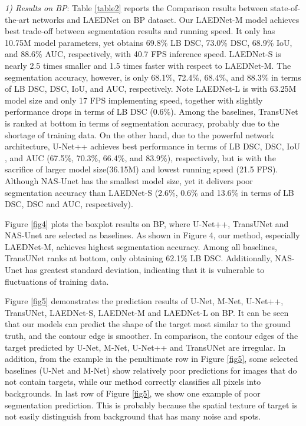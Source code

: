 \documentclass[review]{elsarticle}
\begin{document}
\emph{1) Results on BP}: Table \ref{table2} reports the Comparison results between state-of-the-art networks and LAEDNet on BP \cite{Kaggle} dataset. Our LAEDNet-M model achieves best trade-off between segmentation results and running speed. It only has 10.75M model parameters, yet obtains 69.8\% LB DSC, 73.0\% DSC, 68.9\% IoU, and 88.6\% AUC, respectively, with 40.7 FPS inference speed. LAEDNet-S is nearly 2.5 times smaller and 1.5 times faster with respect to LAEDNet-M. The segmentation accuracy, however, is only 68.1\%, 72.4\%, 68.4\%, and 88.3\% in terms of LB DSC, DSC, IoU, and AUC, respectively. Note LAEDNet-L is with 63.25M model size and only 17 FPS implementing speed, together with slightly performance drops in terms of LB DSC (0.6\%). Among the baselines, TransUNet\cite{chen2021transunet} is ranked at bottom in terms of segmentation accuracy, probably due to the shortage of training data. On the other hand, due to the powerful network architecture, U-Net++\cite{2020UNet} achieves best performance in terms of LB DSC, DSC, IoU , and AUC (67.5\%, 70.3\%, 66.4\%, and 83.9\%), respectively, but is with the sacrifice of larger model size(36.15M) and lowest running speed (21.5 FPS). Although NAS-Unet\cite{2019Nas-unet} has the smallest model size, yet it delivers poor segmentation accuracy than LAEDNet-S (2.6\%, 0.6\% and 13.6\% in terms of LB DSC, DSC and AUC, respectively).

Figure \ref{fig4} plots the boxplot results on BP\cite{Kaggle}, where U-Net++,\cite{2020UNet} TransUNet\cite{chen2021transunet} and NAS-Unet\cite{2019Nas-unet} are selected as baselines. As shown in Figure 4, our method, especially LAEDNet-M, achieves highest segmentation accuracy. Among all baselines, TransUNet\cite{chen2021transunet} ranks at bottom, only obtaining 62.1\% LB DSC. Additionally, NAS-Unet\cite{2019Nas-unet} has greatest standard deviation, indicating that it is vulnerable to fluctuations of training data.

Figure \ref{fig5} demonstrates the prediction results of U-Net\cite{2015U}, M-Net\cite{2018Joint}, U-Net++\cite{2020UNet}, TransUNet\cite{chen2021transunet}, LAEDNet-S, LAEDNet-M and LAEDNet-L on BP\cite{Kaggle}. It can be seen that our models can predict the shape of the target most similar to the ground truth, and the contour edge is smoother. In comparison, the contour edges of the target predicted by U-Net\cite{2015U}, M-Net\cite{2018Joint}, U-Net++\cite{2020UNet} and TransUNet\cite{chen2021transunet} are irregular. In addition, from the example in the penultimate row in Figure \ref{fig5}, some selected baselines (U-Net\cite{2015U} and M-Net\cite{2018Joint}) show relatively poor predictions for images that do not contain targets, while our method correctly classifies all pixels into backgrounds. In last row of Figure \ref{fig5}, we show one example of poor segmentation prediction. This is probably because the spatial texture of target is not easily distinguish from background that has many noise and spots.
\end{document}
